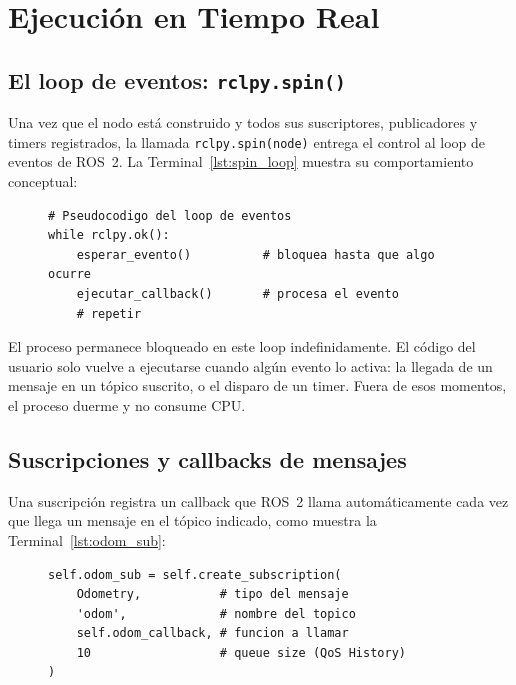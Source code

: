 \section{Ejecución en Tiempo Real}
\label{sec:runtime}

\subsection{El loop de eventos: \texttt{rclpy.spin()}}

Una vez que el nodo está construido y todos sus suscriptores, publicadores y timers registrados, la llamada \texttt{rclpy.spin(node)} entrega el control al loop de eventos de ROS~2. La Terminal~\ref{lst:spin_loop} muestra su comportamiento conceptual:

\begin{figure}[H]
\centering
\begin{lstlisting}[style=bash, caption={Comportamiento conceptual de \texttt{rclpy.spin()}.}, label={lst:spin_loop}]
# Pseudocodigo del loop de eventos
while rclpy.ok():
    esperar_evento()          # bloquea hasta que algo ocurre
    ejecutar_callback()       # procesa el evento
    # repetir
\end{lstlisting}
\end{figure}

El proceso permanece bloqueado en este loop indefinidamente. El código del usuario solo vuelve a ejecutarse cuando algún evento lo activa: la llegada de un mensaje en un tópico suscrito, o el disparo de un timer. Fuera de esos momentos, el proceso duerme y no consume CPU.

\subsection{Suscripciones y callbacks de mensajes}

Una suscripción registra un callback que ROS~2 llama automáticamente cada vez que llega un mensaje en el tópico indicado, como muestra la Terminal~\ref{lst:odom_sub}:

\begin{figure}[H]
\centering
\begin{lstlisting}[style=python, caption={Registro de una suscripción a odometría.}, label={lst:odom_sub}]
self.odom_sub = self.create_subscription(
    Odometry,           # tipo del mensaje
    'odom',             # nombre del topico
    self.odom_callback, # funcion a llamar
    10                  # queue size (QoS History)
)
\end{lstlisting}
\end{figure}

